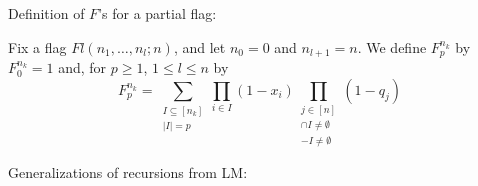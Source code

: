 \documentclass[11pt]{article}
\begin{document}



\pagebreak Definition of $F$'s for a partial flag: 
\begin{definition}
    Fix a flag $Fl(n_1,\ldots,n_l;n)$, and let $n_0 = 0$ and $n_{l+1} = n$.  We define $F_p^{n_k}$ by $F_0^{n_k} = 1$ and, for $p\geq 1$, $1 \leq l \leq n$ by
    \begin{equation*}
        F_p^{n_k} = \sum_{\substack{I \subseteq [n_k] \\ |I| = p}} \prod_{i \in I}(1-x_i) \prod_{\substack{j \in [n] \\ [n_{j-1}+1, \ldots, n_j] \cap I \neq \emptyset \\ [n_{j}+1, \ldots, n_{j+1}] - I \neq \emptyset}}(1-q_j)
    \end{equation*}
\end{definition}

Generalizations of recursions from LM:
\end{document}
